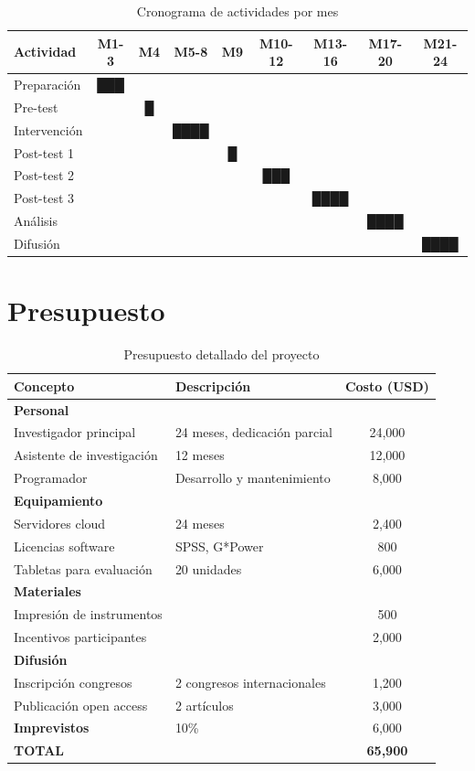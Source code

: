 \documentclass[12pt,a4paper]{article}
\begin{document}
\begin{table}[H]
\centering
\caption{Cronograma de actividades por mes}
\begin{tabular}{|l|c|c|c|c|c|c|c|c|}
\hline
\textbf{Actividad} & \textbf{M1-3} & \textbf{M4} & \textbf{M5-8} & \textbf{M9} & \textbf{M10-12} & \textbf{M13-16} & \textbf{M17-20} & \textbf{M21-24} \\
\hline
Preparación & ███ & & & & & & & \\
Pre-test & & █ & & & & & & \\
Intervención & & & ████ & & & & & \\
Post-test 1 & & & & █ & & & & \\
Post-test 2 & & & & & ███ & & & \\
Post-test 3 & & & & & & ████ & & \\
Análisis & & & & & & & ████ & \\
Difusión & & & & & & & & ████ \\
\hline
\end{tabular}
\end{table}

\section{Presupuesto}

\begin{table}[H]
\centering
\caption{Presupuesto detallado del proyecto}
\begin{tabular}{|l|l|c|}
\hline
\textbf{Concepto} & \textbf{Descripción} & \textbf{Costo (USD)} \\
\hline
\multicolumn{3}{|l|}{\textbf{Personal}} \\
\hline
Investigador principal & 24 meses, dedicación parcial & 24,000 \\
Asistente de investigación & 12 meses & 12,000 \\
Programador & Desarrollo y mantenimiento & 8,000 \\
\hline
\multicolumn{3}{|l|}{\textbf{Equipamiento}} \\
\hline
Servidores cloud & 24 meses & 2,400 \\
Licencias software & SPSS, G*Power & 800 \\
Tabletas para evaluación & 20 unidades & 6,000 \\
\hline
\multicolumn{3}{|l|}{\textbf{Materiales}} \\
\hline
Impresión de instrumentos & & 500 \\
Incentivos participantes & & 2,000 \\
\hline
\multicolumn{3}{|l|}{\textbf{Difusión}} \\
\hline
Inscripción congresos & 2 congresos internacionales & 1,200 \\
Publicación open access & 2 artículos & 3,000 \\
\hline
\textbf{Imprevistos} & 10\% & 6,000 \\
\hline
\textbf{TOTAL} & & \textbf{65,900} \\
\hline
\end{tabular}
\end{table}
\end{document}
